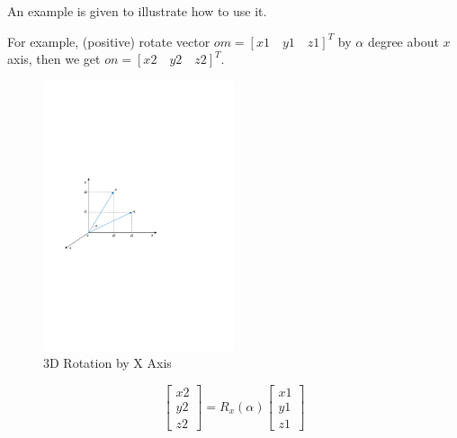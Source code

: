\documentclass{article} %
\numberwithin{equation}{section} %
\begin{document}
An example is given to illustrate how to use it.

For example, (positive) rotate vector $om=[x1\quad y1\quad z1]^T$ by $\alpha$ degree about $x$ axis, then we get $on=[x2\quad y2\quad z2]^T$.
\begin{figure}[htbp]
\centering
\includegraphics[width=0.50\textwidth]{derive_3d_rotation_matrix_rotate_x.pdf}
\caption{3D Rotation by X Axis}
\end{figure}

\begin{equation}
\begin{bmatrix}x2\\y2\\z2\end{bmatrix}=R_x(\alpha)\begin{bmatrix}x1\\y1\\z1\end{bmatrix}
\end{equation}
\end{document}
